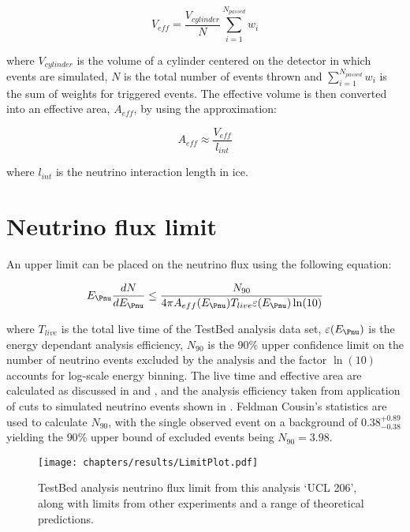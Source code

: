\begin{equation}
  V_{eff} = \frac {V_{cylinder}}{N} \sum_{i=1}^{N_{passed}} w_{i}
\end{equation}

\noindent where $V_{cylinder}$ is the volume of a cylinder centered on the detector in which events are simulated, $N$ is the total number of events thrown and $\sum_{i=1}^{N_{passed}} w_{i}$ is the sum of weights for triggered events. The effective volume is then converted into an effective area, $A_{eff}$, by using the approximation:

\begin{equation}
  A_{eff} \approx \frac{V_{eff}}{l_{int}}
\end{equation}

\noindent where $l_{int}$ is the neutrino interaction length in ice. 

\section{Neutrino flux limit}
\label{sec:Results:Limit}

An upper limit can be placed on the neutrino flux using the following equation:

\begin{equation}
  E_{\Pnu} \frac {dN}{dE_{\Pnu}} \leq \frac{N_{90}}{4\pi A_{eff}(E_{\Pnu}) T_{live} \varepsilon(E_{\Pnu}) \ln(10)}
\end{equation}

\noindent where $T_{live}$ is the total live time of the TestBed analysis data set, $\varepsilon(E_{\Pnu})$ is the energy dependant analysis efficiency, $N_{90}$ is the $90\%$ upper confidence limit on the number of neutrino events excluded by the analysis and the factor $\ln(10)$ accounts for log-scale energy binning. The live time and effective area are calculated as discussed in  and , and the analysis efficiency taken from application of cuts to simulated neutrino events shown in . Feldman Cousin's statistics are used to calculate $N_{90}$, with the single observed event on a background of $0.38^{+0.89}_{-0.38}$ yielding the $90\%$ upper bound of excluded events being $N_{90}=3.98$.

\begin{figure}[htpb]
  \texttt{[image: chapters/results/LimitPlot.pdf]}
  \caption{TestBed analysis neutrino flux limit from this analysis `UCL 206', along with limits from other experiments and a range of theoretical predictions.}
  \label{fig:Results:Limit-Plot}
\end{figure}

